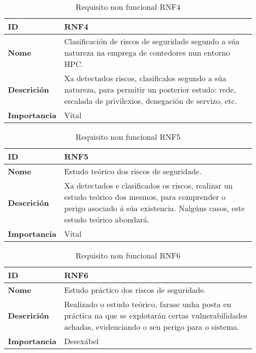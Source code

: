 \begin{table}[H]
\centering
\caption{Requisito non funcional RNF4}
\label{RNF4}
\begin{tabularx}{\textwidth}{|l|X|}
\hline
\textbf{ID} & RNF4 \\ \hline
\textbf{Nome} & Clasificación de riscos de seguridade segundo a súa natureza na emprega de contedores nun entorno \gls{HPC}. \\ \hline
\textbf{Descrición} & Xa detectados riscos, clasificalos segundo a súa natureza, para permitir un posterior estudo: rede, escalada de privilexios, denegación de servizo, etc. \\ \hline
\textbf{Importancia} & Vital \\ \hline
\end{tabularx}
\end{table}

\begin{table}[H]
\centering
\caption{Requisito non funcional RNF5}
\label{RNF5}
\begin{tabularx}{\textwidth}{|l|X|}
\hline
\textbf{ID} & RNF5 \\ \hline
\textbf{Nome} & Estudo teórico dos riscos de seguridade. \\ \hline
\textbf{Descrición} & Xa detectados e clasificados os riscos, realizar un estudo teórico dos mesmos, para comprender o perigo asociado á súa existencia. Nalgúns casos, este estudo teórico abondará. \\ \hline
\textbf{Importancia} & Vital \\ \hline
\end{tabularx}
\end{table}

\begin{table}[H]
\centering
\caption{Requisito non funcional RNF6}
\label{RNF6}
\begin{tabularx}{\textwidth}{|l|X|}
\hline
\textbf{ID} & RNF6 \\ \hline
\textbf{Nome} & Estudo práctico dos riscos de seguridade. \\ \hline
\textbf{Descrición} & Realizado o estudo teórico, farase unha posta en práctica na que se explotarán certas vulnerabilidades achadas, evidenciando o seu perigo para o sistema. \\ \hline
\textbf{Importancia} & Desexábel \\ \hline
\end{tabularx}
\end{table}

